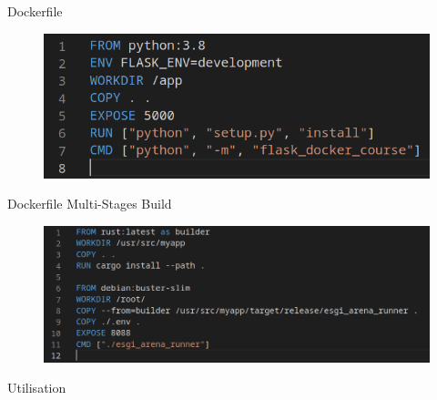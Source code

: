 \documentclass[11pt]{beamer}
\begin{document}
\begin{frame}{Dockerfile}
	\begin{figure}
		\includegraphics[scale=0.5]{images/dockerfile.png}
	\end{figure}

\end{frame}

\begin{frame}{Dockerfile Multi-Stages Build}
	\begin{figure}
		\includegraphics[scale=0.4]{images/dockerfile_multi.png}
	\end{figure}

\end{frame}

\begin{frame}{Utilisation}
	\centering
	
\end{frame}
\end{document}
